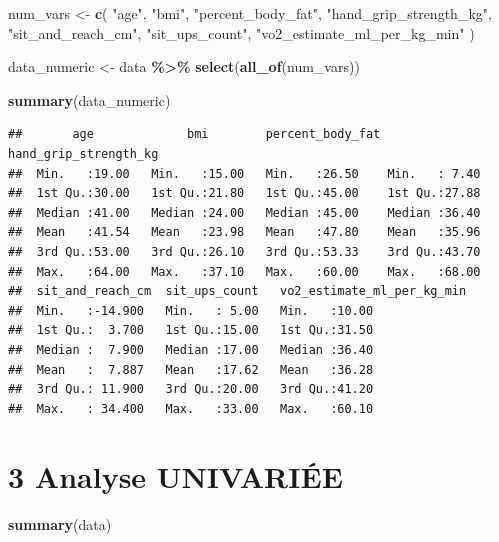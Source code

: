 \documentclass[
]{article}
\newenvironment{Shaded}{\begin{snugshade}}{\end{snugshade}}
\newcommand{\FunctionTok}[1]{\textcolor[rgb]{0.13,0.29,0.53}{\textbf{#1}}}
\newcommand{\NormalTok}[1]{#1}
\newcommand{\OtherTok}[1]{\textcolor[rgb]{0.56,0.35,0.01}{#1}}
\newcommand{\SpecialCharTok}[1]{\textcolor[rgb]{0.81,0.36,0.00}{\textbf{#1}}}
\newcommand{\StringTok}[1]{\textcolor[rgb]{0.31,0.60,0.02}{#1}}
\begin{document}
\begin{Shaded}
\begin{Highlighting}[]
\NormalTok{num\_vars }\OtherTok{\textless{}{-}} \FunctionTok{c}\NormalTok{(}
  \StringTok{"age"}\NormalTok{,}
  \StringTok{"bmi"}\NormalTok{,}
  \StringTok{"percent\_body\_fat"}\NormalTok{,}
  \StringTok{"hand\_grip\_strength\_kg"}\NormalTok{,}
  \StringTok{"sit\_and\_reach\_cm"}\NormalTok{,}
  \StringTok{"sit\_ups\_count"}\NormalTok{,}
  \StringTok{"vo2\_estimate\_ml\_per\_kg\_min"}
\NormalTok{)}

\NormalTok{data\_numeric }\OtherTok{\textless{}{-}}\NormalTok{ data }\SpecialCharTok{\%\textgreater{}\%} \FunctionTok{select}\NormalTok{(}\FunctionTok{all\_of}\NormalTok{(num\_vars))}

\FunctionTok{summary}\NormalTok{(data\_numeric)}
\end{Highlighting}
\end{Shaded}

\begin{verbatim}
##       age             bmi        percent_body_fat hand_grip_strength_kg
##  Min.   :19.00   Min.   :15.00   Min.   :26.50    Min.   : 7.40        
##  1st Qu.:30.00   1st Qu.:21.80   1st Qu.:45.00    1st Qu.:27.88        
##  Median :41.00   Median :24.00   Median :45.00    Median :36.40        
##  Mean   :41.54   Mean   :23.98   Mean   :47.80    Mean   :35.96        
##  3rd Qu.:53.00   3rd Qu.:26.10   3rd Qu.:53.33    3rd Qu.:43.70        
##  Max.   :64.00   Max.   :37.10   Max.   :60.00    Max.   :68.00        
##  sit_and_reach_cm  sit_ups_count   vo2_estimate_ml_per_kg_min
##  Min.   :-14.900   Min.   : 5.00   Min.   :10.00             
##  1st Qu.:  3.700   1st Qu.:15.00   1st Qu.:31.50             
##  Median :  7.900   Median :17.00   Median :36.40             
##  Mean   :  7.887   Mean   :17.62   Mean   :36.28             
##  3rd Qu.: 11.900   3rd Qu.:20.00   3rd Qu.:41.20             
##  Max.   : 34.400   Max.   :33.00   Max.   :60.10
\end{verbatim}

\section{3 Analyse UNIVARIÉE}\label{analyse-univariuxe9e}

\begin{Shaded}
\begin{Highlighting}[]
\FunctionTok{summary}\NormalTok{(data)}
\end{Highlighting}
\end{Shaded}
\end{document}
